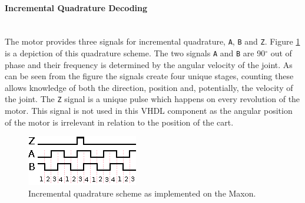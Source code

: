 \paragraph{Incremental Quadrature Decoding}~\\ %
\label{par:incremental_quadrature}
The motor provides three signals for incremental quadrature, \texttt{A}, \texttt{B} and \texttt{Z}. 
Figure \ref{fig:quadrature} is a depiction of this quadrature scheme.
The two signals \texttt{A} and \texttt{B} are 90$^\circ$ out of phase and their frequency is determined by the angular velocity of the joint.
As can be seen from the figure the signals create four unique stages, counting these allows knowledge of both the direction, position and, potentially, the velocity of the joint.
The \texttt{Z} signal is a unique pulse which happens on every revolution of the motor.
This signal is not used in this VHDL component as the angular position of the motor is irrelevant in relation to the position of the cart.

\begin{figure}[h]
	\centering
	\includegraphics[width=.5\linewidth]{graphics/quadrature}
	\caption{Incremental quadrature scheme as implemented on the Maxon.}
	\label{fig:quadrature}
\end{figure}

